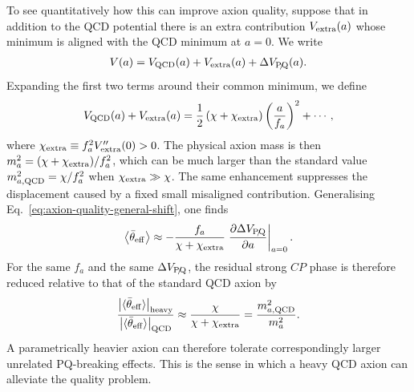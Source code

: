 \documentclass[review]{elsarticle}
\numberwithin{equation}{section}
\numberwithin{table}{section}
\numberwithin{figure}{section}
\begin{document}
To see quantitatively how this can improve axion quality, suppose that in addition to the QCD potential there is an extra contribution $V_{\rm extra}(a)$ whose minimum is aligned with the QCD minimum at $a=0$. We write
\begin{align}
    V(a)
    =
    V_{\rm QCD}(a)
    +
    V_{\rm extra}(a)
    +
    \Delta V_{\slashed{\rm PQ}}(a).
    \label{eq:heavy-axion-total-potential}
\end{align}
Expanding the first two terms around their common minimum, we define
\begin{align}
    V_{\rm QCD}(a)
    +
    V_{\rm extra}(a)
    =
    \frac{1}{2}
    \left(
        \chi+\chi_{\rm extra}
    \right)
    \left(
        \frac{a}{f_a}
    \right)^2
    +\cdots ,
    \label{eq:heavy-axion-aligned-potential}
\end{align}
where $\chi_{\rm extra}\equiv f_a^2V_{\rm extra}''(0)>0$. The physical axion mass is then $m_a^2=(\chi+\chi_{\rm extra})/f_a^2$,
which can be much larger than the standard value $m_{a,{\rm QCD}}^2=\chi/f_a^2$ when $\chi_{\rm extra}\gg\chi$. The same enhancement suppresses the displacement caused by a fixed small misaligned contribution. Generalising Eq.~\eqref{eq:axion-quality-general-shift}, one finds
\begin{align}
    \left\langle\bar\theta_{\rm eff}\right\rangle
    \approx
    -\frac{f_a}{\chi+\chi_{\rm extra}}
    \left.
    \frac{\partial\Delta V_{\slashed{\rm PQ}}}
         {\partial a}
    \right|_{a=0}.
    \label{eq:heavy-axion-quality-shift}
\end{align}
For the same $f_a$ and the same $\Delta V_{\slashed{\rm PQ}}$, the residual strong $CP$ phase is therefore reduced relative to that of the standard QCD axion by
\begin{align}
    \frac{\left|\langle\bar\theta_{\rm eff}\rangle\right|_{\rm heavy}
    }{\left|\langle\bar\theta_{\rm eff}\rangle\right|_{\rm QCD}
    }
    \approx
    \frac{\chi}{\chi+\chi_{\rm extra}}
    =
    \frac{m_{a,{\rm QCD}}^2}{m_a^2}.
    \label{eq:heavy-axion-quality-improvement}
\end{align}
A parametrically heavier axion can therefore tolerate correspondingly larger unrelated PQ-breaking effects. This is the sense in which a heavy QCD axion can alleviate the quality problem.
\end{document}
